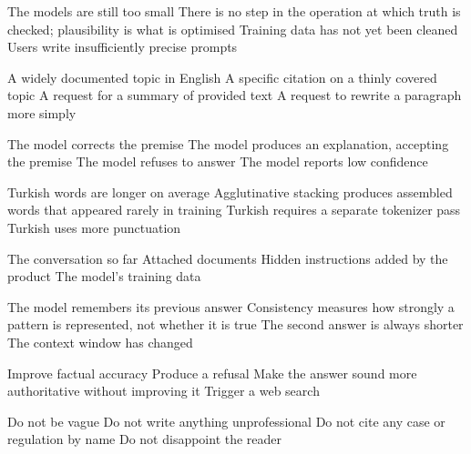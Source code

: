 \documentclass[11pt,a4paper]{article}
\begin{document}

\begin{questions}

  {The models are still too small}
  {There is no step in the operation at which truth is checked; plausibility is what is optimised}
  {Training data has not yet been cleaned}
  {Users write insufficiently precise prompts}

  {A widely documented topic in English}
  {A specific citation on a thinly covered topic}
  {A request for a summary of provided text}
  {A request to rewrite a paragraph more simply}

  {The model corrects the premise}
  {The model produces an explanation, accepting the premise}
  {The model refuses to answer}
  {The model reports low confidence}

  {Turkish words are longer on average}
  {Agglutinative stacking produces assembled words that appeared rarely in training}
  {Turkish requires a separate tokenizer pass}
  {Turkish uses more punctuation}

  {The conversation so far}
  {Attached documents}
  {Hidden instructions added by the product}
  {The model's training data}

  {The model remembers its previous answer}
  {Consistency measures how strongly a pattern is represented, not whether it is true}
  {The second answer is always shorter}
  {The context window has changed}

  {Improve factual accuracy}
  {Produce a refusal}
  {Make the answer sound more authoritative without improving it}
  {Trigger a web search}

  {Do not be vague}
  {Do not write anything unprofessional}
  {Do not cite any case or regulation by name}
  {Do not disappoint the reader}


\end{questions}
\end{document}
